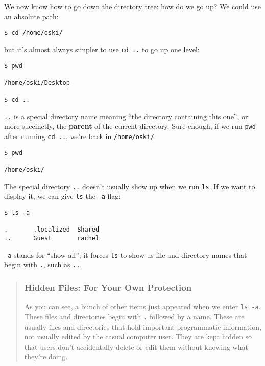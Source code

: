 \documentclass[
]{book}
\begin{document}
We now know how to go down the directory tree: how do we go up? We could use an absolute path:

\begin{verbatim}
$ cd /home/oski/
\end{verbatim}

but it's almost always simpler to use \texttt{cd\ ..} to go up one level:

\begin{verbatim}
$ pwd

/home/oski/Desktop

$ cd ..
\end{verbatim}

\texttt{..} is a special directory name meaning ``the directory containing this one'',
or more succinctly, the \textbf{parent} of the current directory. Sure enough, if we run \texttt{pwd} after running \texttt{cd\ ..}, we're back in \texttt{/home/oski/}:

\begin{verbatim}
$ pwd

/home/oski/
\end{verbatim}

The special directory \texttt{..} doesn't usually show up when we run \texttt{ls}. If we want to display it, we can give \texttt{ls} the \texttt{-a} flag:

\begin{verbatim}
$ ls -a

.       .localized  Shared
..      Guest       rachel
\end{verbatim}

\texttt{-a} stands for ``show all''; it forces \texttt{ls} to show us file and directory names that begin with \texttt{.}, such as \texttt{..}.

\begin{quote}
\hypertarget{hidden-files-for-your-own-protection}{%
\subsubsection{Hidden Files: For Your Own Protection}\label{hidden-files-for-your-own-protection}}

As you can see, a bunch of other items just appeared when we enter \texttt{ls\ -a}.
These files and directories begin with \texttt{.} followed by a name. These are
usually files and directories that hold important programmatic information,
not usually edited by the casual computer user. They are kept hidden so that
users don't accidentally delete or edit them without knowing what they're
doing.
\end{quote}
\end{document}
